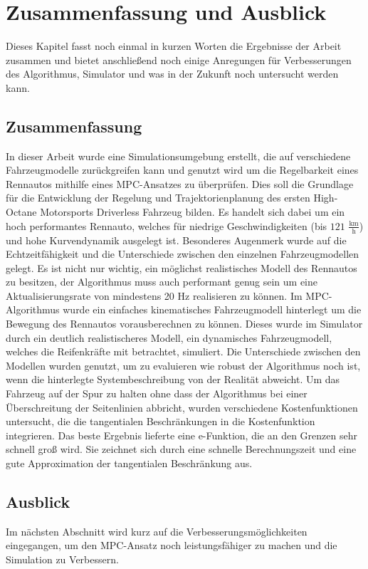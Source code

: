 \documentclass{like}
\begin{document}
\chapter[Ausblick]{Zusammenfassung und Ausblick}
Dieses Kapitel fasst noch einmal in kurzen Worten die Ergebnisse der Arbeit zusammen und bietet anschließend noch einige Anregungen für Verbesserungen des Algorithmus, Simulator und was in der Zukunft noch untersucht werden kann.
\section{Zusammenfassung}
In dieser Arbeit wurde eine Simulationsumgebung erstellt, die auf verschiedene Fahrzeugmodelle zurückgreifen kann und genutzt wird um die Regelbarkeit eines Rennautos mithilfe eines \ac{MPC}-Ansatzes zu überprüfen. Dies soll die Grundlage für die Entwicklung der Regelung und Trajektorienplanung des ersten High-Octane Motorsports Driverless Fahrzeug bilden. Es handelt sich dabei um ein hoch performantes Rennauto, welches für niedrige Geschwindigkeiten (bis $121$ $\frac{\text{km}}{\text{h}}$) und hohe Kurvendynamik ausgelegt ist. Besonderes Augenmerk wurde auf die Echtzeitfähigkeit und die Unterschiede zwischen den einzelnen Fahrzeugmodellen gelegt. Es ist nicht nur wichtig, ein möglichst realistisches Modell des Rennautos zu besitzen, der Algorithmus muss auch performant genug sein um eine Aktualisierungsrate von mindestens 20 Hz realisieren zu können. 
Im \ac{MPC}-Algorithmus wurde ein einfaches kinematisches Fahrzeugmodell hinterlegt um die Bewegung des Rennautos vorausberechnen zu können. Dieses wurde im Simulator durch ein deutlich realistischeres Modell, ein dynamisches Fahrzeugmodell, welches die Reifenkräfte mit betrachtet, simuliert. Die Unterschiede zwischen den Modellen wurden genutzt, um zu evaluieren wie robust der Algorithmus noch ist, wenn die hinterlegte Systembeschreibung von der Realität abweicht. Um das Fahrzeug auf der Spur zu halten ohne dass der Algorithmus bei einer Überschreitung der Seitenlinien abbricht, wurden verschiedene Kostenfunktionen untersucht, die die tangentialen Beschränkungen in die Kostenfunktion integrieren. Das beste Ergebnis lieferte eine e-Funktion, die an den Grenzen sehr schnell groß wird. Sie zeichnet sich durch eine schnelle Berechnungszeit und eine gute Approximation der tangentialen Beschränkung aus.

\section{Ausblick}
Im nächsten Abschnitt wird kurz auf die Verbesserungsmöglichkeiten eingegangen, um den \ac{MPC}-Ansatz noch leistungsfähiger zu machen und die Simulation zu Verbessern.
\end{document}
